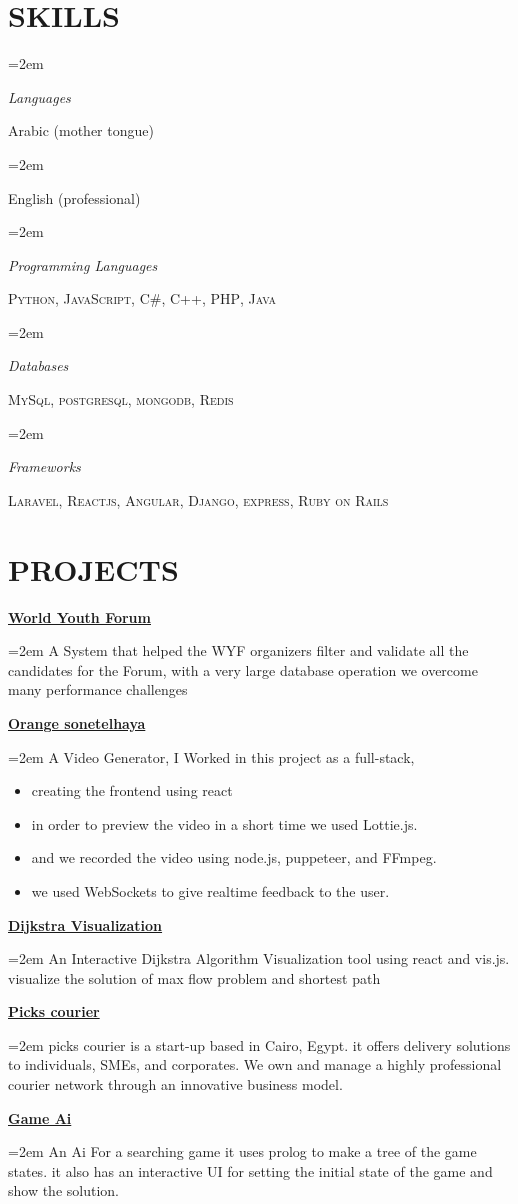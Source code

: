 \documentclass[paper=a4,fontsize=11pt]{scrartcl} %
\newlength{\spacebox}
\newcommand{\sepspace}{\vspace*{1em}}		%
\newcommand{\NewPart}[1]{\section*{\uppercase{#1}}}
\newcommand{\PersonalEntry}[2]{
		\noindent\hangindent=1em\hangafter=0 %
		\parbox{\spacebox}{        %
		\textit{#1}}		       %
		\hspace{1.5em} #2 \par}    %
\newcommand{\SkillsEntry}[2]{      %
		\noindent\hangindent=2em\hangafter=0 %
		\parbox{\spacebox}{        %
		\textit{#1}}			   %
		\hspace{1.5em} #2 \par}    %
\newcommand{\ProjectEntry}[2]{
		\noindent \textbf{#1} \hfill      %
		
		\noindent\hangindent=2em\hangafter=0 \small #2 %
		\normalsize \par}
\begin{document}
\NewPart{Skills}{
\SkillsEntry{Languages}{Arabic (mother tongue)}
\SkillsEntry{}{English (professional)}

\sepspace
\SkillsEntry{Programming Languages}{\textsc{Python}, \textsc{JavaScript},  \textsc{C\#}, \textsc{C++},  \textsc{PHP}, \textsc{Java}}
\sepspace


\SkillsEntry{Databases}{\textsc{MySql}, \textsc{postgresql}, \textsc{mongodb}, \textsc{Redis}}

\sepspace


\SkillsEntry{Frameworks}{\textsc{Laravel}, \textsc{Reactjs}, \textsc{Angular}, \textsc{Django}, \textsc{express}, \textsc{Ruby on Rails}}

}

\NewPart{projects}{
\ProjectEntry{\href{https://wyfegypt.com/}{World Youth Forum}}{A System that helped the WYF organizers filter and validate all the candidates for the Forum, with a very large database operation we overcome many performance challenges}
\ProjectEntry{\href{https://orange-sonetelhaya.com/}{Orange sonetelhaya}}{A Video Generator, I Worked in this project as a full-stack, 
\begin{itemize}
 \item creating the frontend using react
 \item in order to preview the video in a short time we used Lottie.js.
 \item and we recorded the video using node.js, puppeteer, and FFmpeg.
 \item we used WebSockets to give realtime feedback to the user.
\end{itemize}
}
\ProjectEntry{\href{https://react-dijkstra.now.sh}{Dijkstra Visualization}}{
An Interactive Dijkstra Algorithm Visualization tool using react and vis.js. visualize the solution of max flow problem and shortest path
}

\ProjectEntry{\href{http://pickscourier.com}{Picks courier}}{
picks courier is a start-up based in Cairo, Egypt. it offers delivery solutions to individuals, SMEs, and corporates. We own and manage a highly professional courier network through an innovative business model.}


\ProjectEntry{\href{https://github.com/peter44322/p5js-search}{Game Ai}}{An Ai For a searching game it uses prolog to make a tree of the game states. it also has an interactive UI for setting the initial state of the game and show the solution.}

}
\end{document}
